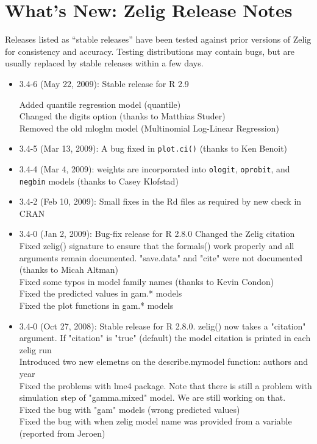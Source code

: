 
\section{What's New:  Zelig Release Notes}\label{release.notes}

Releases listed as ``stable releases'' have been tested against prior
versions of Zelig for consistency and accuracy.  Testing distributions
may contain bugs, but are usually replaced by stable releases within a
few days. 

\begin{itemize} 
\item {3.4-6} (May 22, 2009): Stable release for R 2.9

Added quantile regression model (quantile) \\
Changed the digits option (thanks to Matthias Studer) \\
Removed the old mloglm model (Multinomial Log-Linear Regression)\\

\item {3.4-5} (Mar 13, 2009): A bug fixed in {\tt plot.ci()} (thanks to Ken Benoit) \\

\item {3.4-4} (Mar 4, 2009): weights are incorporated into {\tt ologit}, {\tt oprobit}, and {\tt negbin} models (thanks to Casey Klofstad) \\

\item {3.4-2} (Feb 10, 2009): Small fixes in the Rd files as required 
by new check in CRAN \\

\item {3.4-0} (Jan 2, 2009): Bug-fix release for R 2.8.0
Changed the Zelig citation \\
Fixed zelig() signature to ensure that the formals() work properly 
and all arguments remain documented. "save.data" and "cite" were not 
documented (thanks to Micah Altman)\\
Fixed some typos in model family names (thanks to Kevin Condon)\\
Fixed the predicted values in gam.* models \\
Fixed the plot functions in gam.* models \\

\item {3.4-0} (Oct 27, 2008): Stable release for R 2.8.0.
zelig() now takes a "citation" argument. If "citation" is "true" (default)
the model citation is printed in each zelig run \\
Introduced two new elemetns on the describe.mymodel function: authors and year \\
Fixed the problems with lme4 package. Note that there is still a problem with 
simulation step of "gamma.mixed" model. We are still working on that. \\
Fixed the bug with "gam" models (wrong predicted values) \\
Fixed the bug with when zelig model name was provided from a variable (reported from 
Jeroen)


\end{itemize}
